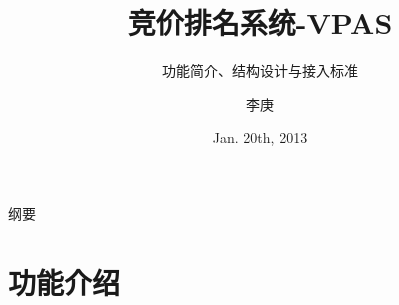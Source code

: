 \documentclass{beamer}
\begin{document}
\begin{CJK}{UTF8}{gbsn}

\title{竞价排名系统-VPAS}

\subtitle{功能简介、结构设计与接入标准}

\author{李庚}


\date{Jan. 20th, 2013}

\subject{2014技术分享}





\begin{frame}
  \titlepage
\end{frame}

\begin{frame}{纲要}
  \tableofcontents
\end{frame}

\section{功能介绍}


\end{CJK}
\end{document}
